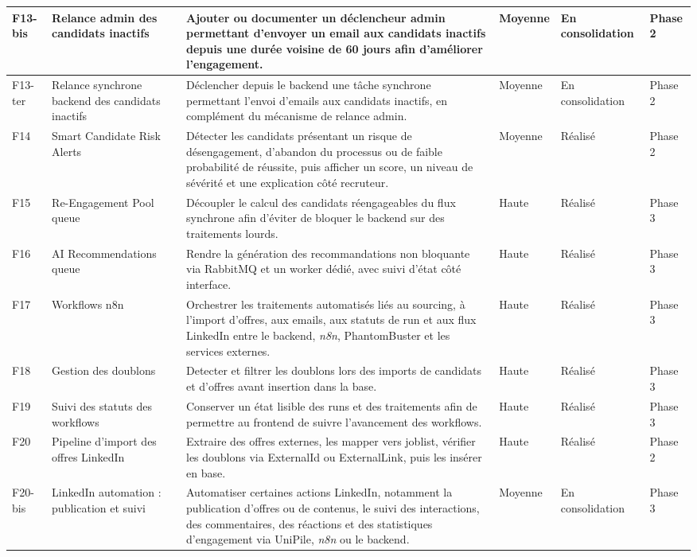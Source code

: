 \begin{longtable}{|p{0.85cm}|p{2.8cm}|p{4.9cm}|p{1.65cm}|p{1.55cm}|p{1.25cm}|}
\hline
F13-bis & Relance admin des candidats inactifs & Ajouter ou documenter un déclencheur admin permettant d'envoyer un email aux candidats inactifs depuis une durée voisine de 60 jours afin d'améliorer l'engagement. & Moyenne & En consolidation & Phase 2 \\
\hline
F13-ter & Relance synchrone backend des candidats inactifs & Déclencher depuis le backend une tâche synchrone permettant l'envoi d'emails aux candidats inactifs, en complément du mécanisme de relance admin. & Moyenne & En consolidation & Phase 2 \\
\hline
F14 & Smart Candidate Risk Alerts & Détecter les candidats présentant un risque de désengagement, d'abandon du processus ou de faible probabilité de réussite, puis afficher un score, un niveau de sévérité et une explication côté recruteur. & Moyenne & Réalisé & Phase 2 \\
\hline
F15 & Re-Engagement Pool queue & Découpler le calcul des candidats réengageables du flux synchrone afin d'éviter de bloquer le backend sur des traitements lourds. & Haute & Réalisé & Phase 3 \\
\hline
F16 & AI Recommendations queue & Rendre la génération des recommandations non bloquante via RabbitMQ et un worker dédié, avec suivi d'état côté interface. & Haute & Réalisé & Phase 3 \\
\hline
F17 & Workflows n8n & Orchestrer les traitements automatisés liés au sourcing, à l'import d'offres, aux emails, aux statuts de run et aux flux LinkedIn entre le backend, \textit{n8n}, PhantomBuster et les services externes. & Haute & Réalisé & Phase 3 \\
\hline
F18 & Gestion des doublons & Detecter et filtrer les doublons lors des imports de candidats et d'offres avant insertion dans la base. & Haute & Réalisé & Phase 3 \\
\hline
F19 & Suivi des statuts des workflows & Conserver un état lisible des runs et des traitements afin de permettre au frontend de suivre l'avancement des workflows. & Haute & Réalisé & Phase 3 \\
\hline
F20 & Pipeline d'import des offres LinkedIn & Extraire des offres externes, les mapper vers joblist, vérifier les doublons via ExternalId ou ExternalLink, puis les insérer en base. & Haute & Réalisé & Phase 2 \\
\hline
F20-bis & LinkedIn automation : publication et suivi & Automatiser certaines actions LinkedIn, notamment la publication d'offres ou de contenus, le suivi des interactions, des commentaires, des réactions et des statistiques d'engagement via UniPile, \textit{n8n} ou le backend. & Moyenne & En consolidation & Phase 3 \\

\end{longtable}
